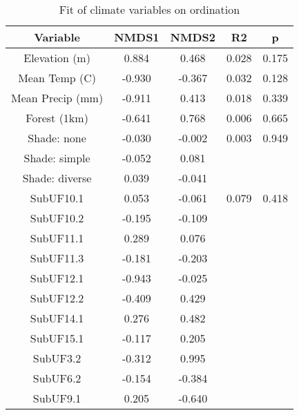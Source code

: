 \begin{table}[!h]
\centering
\caption{\label{tab:nmds_climate_fit}Fit of climate variables on ordination}
\centering
\fontsize{9}{11}\selectfont
\begin{tabular}[t]{ccccc}
\hline\hline
Variable & NMDS1 & NMDS2 & R2 & p\\
\midrule
Elevation (m) & 0.884 & 0.468 & 0.028 & 0.175\\
Mean Temp (C) & -0.930 & -0.367 & 0.032 & 0.128\\
Mean Precip (mm) & -0.911 & 0.413 & 0.018 & 0.339\\
Forest (1km) & -0.641 & 0.768 & 0.006 & 0.665\\
Shade: none & -0.030 & -0.002 & 0.003 & 0.949\\
Shade: simple & -0.052 & 0.081 &  & \\
Shade: diverse & 0.039 & -0.041 &  & \\
SubUF10.1 & 0.053 & -0.061 & 0.079 & 0.418\\
SubUF10.2 & -0.195 & -0.109 &  & \\
SubUF11.1 & 0.289 & 0.076 &  & \\
SubUF11.3 & -0.181 & -0.203 &  & \\
SubUF12.1 & -0.943 & -0.025 &  & \\
SubUF12.2 & -0.409 & 0.429 &  & \\
SubUF14.1 & 0.276 & 0.482 &  & \\
SubUF15.1 & -0.117 & 0.205 &  & \\
SubUF3.2 & -0.312 & 0.995 &  & \\
SubUF6.2 & -0.154 & -0.384 &  & \\
SubUF9.1 & 0.205 & -0.640 &  & \\
\hline\hline
\end{tabular}
\end{table}

